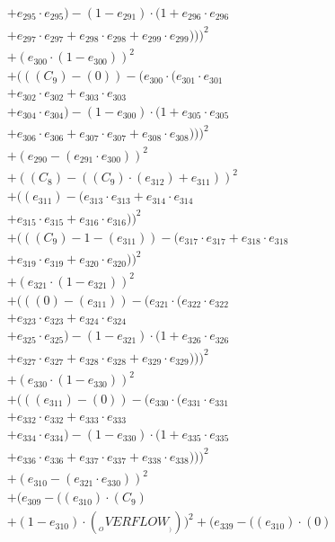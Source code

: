 \documentclass[10pt, a4paper]{article}
\begin{document}
\begin{align*}
& + e_{295} \cdot e_{295}) - (1 - e_{291}) \cdot (1 + e_{296} \cdot e_{296} \\
& + e_{297} \cdot e_{297} + e_{298} \cdot e_{298} + e_{299} \cdot e_{299})))^{2} \\
& + (e_{300} \cdot (1 - e_{300}))^{2} \\
& + (((C_{9}) - (0)) - (e_{300} \cdot (e_{301} \cdot e_{301} \\
& + e_{302} \cdot e_{302} + e_{303} \cdot e_{303} \\
& + e_{304} \cdot e_{304}) - (1 - e_{300}) \cdot (1 + e_{305} \cdot e_{305} \\
& + e_{306} \cdot e_{306} + e_{307} \cdot e_{307} + e_{308} \cdot e_{308})))^{2} \\
& + (e_{290} - (e_{291} \cdot e_{300}))^{2} \\
& + ((C_{8}) - ((C_{9})  \cdot  (e_{312}) + e_{311}))^{2} \\
& + ((e_{311}) - (e_{313} \cdot e_{313} + e_{314} \cdot e_{314} \\
& + e_{315} \cdot e_{315} + e_{316} \cdot e_{316}))^{2} \\
& + (((C_{9}) - 1 - (e_{311})) - (e_{317} \cdot e_{317} + e_{318} \cdot e_{318} \\
& + e_{319} \cdot e_{319} + e_{320} \cdot e_{320}))^{2} \\
& + (e_{321} \cdot (1 - e_{321}))^{2} \\
& + (((0) - (e_{311})) - (e_{321} \cdot (e_{322} \cdot e_{322} \\
& + e_{323} \cdot e_{323} + e_{324} \cdot e_{324} \\
& + e_{325} \cdot e_{325}) - (1 - e_{321}) \cdot (1 + e_{326} \cdot e_{326} \\
& + e_{327} \cdot e_{327} + e_{328} \cdot e_{328} + e_{329} \cdot e_{329})))^{2} \\
& + (e_{330} \cdot (1 - e_{330}))^{2} \\
& + (((e_{311}) - (0)) - (e_{330} \cdot (e_{331} \cdot e_{331} \\
& + e_{332} \cdot e_{332} + e_{333} \cdot e_{333} \\
& + e_{334} \cdot e_{334}) - (1 - e_{330}) \cdot (1 + e_{335} \cdot e_{335} \\
& + e_{336} \cdot e_{336} + e_{337} \cdot e_{337} + e_{338} \cdot e_{338})))^{2} \\
& + (e_{310} - (e_{321} \cdot e_{330}))^{2} \\
& + (e_{309} - ((e_{310})  \cdot  (C_{9}) \\
& + (1 - e_{310})  \cdot  (__OVERFLOW__)))^{2} + (e_{339} - ((e_{310}) \cdot (0) \\

\end{align*}
\end{document}
